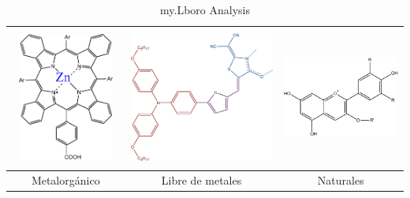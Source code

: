 \begin{table}[h!]
    \centering
    \begin{tabular}{ | c | c | c | }
      \hline
      \begin{minipage}{.3\textwidth}
        \includegraphics[width=37mm, height=42mm]{img/MetalOrganicDye.pdf}
      \end{minipage}
      &
      \begin{minipage}{.3\textwidth}
            \includegraphics[width=\linewidth, height=45mm]{img/dye_scheme.pdf}
      \end{minipage}
      & 
        \begin{minipage}{.3\textwidth}
            \includegraphics[width=40mm, height=35mm]{img/Antocyanin.pdf}
      \end{minipage}
      \\ \hline
      Metalorgánico & Libre de metales & Naturales \\ \hline
    \end{tabular}
    \caption{my.Lboro Analysis}\label{tbl:myLboro}
  \end{table}



